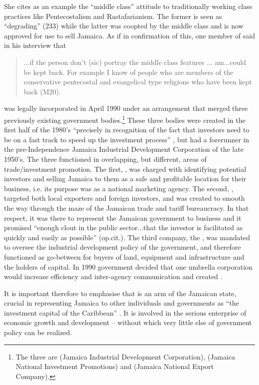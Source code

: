 She cites as an example the “middle class” attitude to traditionally working class practices like Pentecostalism and Rastafarianism.  The former is seen as “degrading” (233) while the latter was coopted by the middle class and is now approved for use to sell Jamaica.  As if in confirmation of this, one member of   said in his interview that

\begin{quote} ...if the person don’t (sic) portray the middle class features ... am...could be kept back.  For example I know of people who are members of the conservative pentecostal and evangelical type religions who have been kept back (M20).\end{quote}

 was legally incorporated in April 1990 under an arrangement that merged three previously existing government bodies.\footnote{The three are  (Jamaica Industrial Development Corporation),  (Jamaica National Investment Promotions) and  (Jamaica National Export Company).}  These three bodies were created in the first half of the 1980's  “precisely in recognition of the fact that investors need to be on a fast track to speed up the investment process” \citep{JAMPRO1997}, but had a forerunner in the pre-Independence Jamaica Industrial Development Corporation of the late 1950's.  The three functioned in overlapping, but different, areas of trade\slash investment promotion.  The first, , was charged with identifying potential investors and selling Jamaica to them as a safe and profitable location for their business, i.e. its purpose was as a national marketing agency.  The second, , targeted both local exporters and foreign investors, and was created to smooth the way through the maze of the Jamaican trade and tariff bureaucracy.  In that respect, it was there to represent the Jamaican government to business and it promised “enough clout in the public sector...that the investor is facilitated as quickly and easily as possible” (op.cit.).  The third company, the , was mandated to oversee the industrial development policy of the government, and therefore functioned as go-between for buyers of land, equipment and infrastructure and the holders of capital.  In 1990 government decided that one umbrella corporation would increase efficiency and inter-agency communication and created .

  It is important therefore to emphasise that  is an arm of the Jamaican state, crucial in representing Jamaica to other individuals and governments as “the investment capital of the Caribbean” \citep{JAMPRO1996}.  It is involved in the serious enterprise of economic growth and development – without which very little else of government policy can be realized.   

